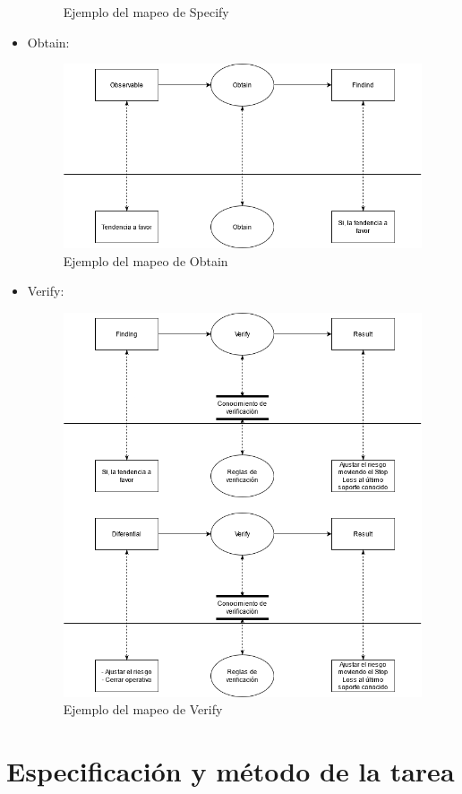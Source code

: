 \begin{itemize}
\begin{figure}[H]
    \caption{\label{fig:Specify}Ejemplo del mapeo de Specify}
  \end{figure}
  \item Obtain:  
  \begin{figure}[H]
    \centering
    \includegraphics[scale=0.50]{imagenes/Obtain.png}
    \caption{\label{fig:Obtain}Ejemplo del mapeo de Obtain}
  \end{figure}
  \newpage
  \item Verify:  
  \begin{figure}[H]
    \centering
    \includegraphics[scale=0.50]{imagenes/Verify.png}
    \caption{\label{fig:Verify}Ejemplo del mapeo de Verify}
  \end{figure}
\end{itemize}

\section{Especificación y método de la tarea}